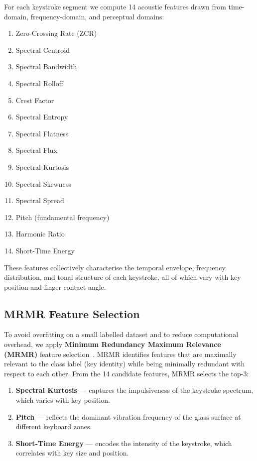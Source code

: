 \documentclass[conference]{IEEEtran}
\begin{document}
For each keystroke segment we compute 14 acoustic features drawn from time-domain, frequency-domain, and perceptual domains:

\begin{enumerate}
  \item Zero-Crossing Rate (ZCR)
  \item Spectral Centroid
  \item Spectral Bandwidth
  \item Spectral Rolloff
  \item Crest Factor
  \item Spectral Entropy
  \item Spectral Flatness
  \item Spectral Flux
  \item Spectral Kurtosis
  \item Spectral Skewness
  \item Spectral Spread
  \item Pitch (fundamental frequency)
  \item Harmonic Ratio
  \item Short-Time Energy
\end{enumerate}

These features collectively characterise the temporal envelope, frequency distribution, and tonal structure of each keystroke, all of which vary with key position and finger contact angle.

\subsection{MRMR Feature Selection}

To avoid overfitting on a small labelled dataset and to reduce computational overhead, we apply \textbf{Minimum Redundancy Maximum Relevance (MRMR)} feature selection~\cite{peng2005feature}. MRMR identifies features that are maximally relevant to the class label (key identity) while being minimally redundant with respect to each other. From the 14 candidate features, MRMR selects the top-3:

\begin{enumerate}
  \item \textbf{Spectral Kurtosis} --- captures the impulsiveness of the keystroke spectrum, which varies with key position.
  \item \textbf{Pitch} --- reflects the dominant vibration frequency of the glass surface at different keyboard zones.
  \item \textbf{Short-Time Energy} --- encodes the intensity of the keystroke, which correlates with key size and position.
\end{enumerate}
\end{document}
